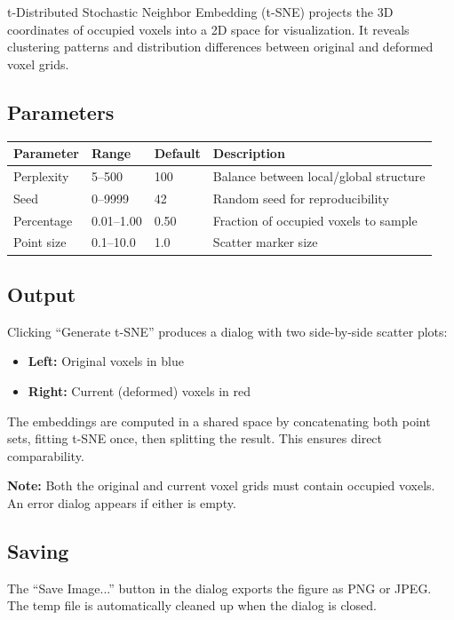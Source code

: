 \documentclass[12pt,a4paper]{article}
\begin{document}
t-Distributed Stochastic Neighbor Embedding (t-SNE) projects the 3D coordinates of occupied voxels into a 2D space for visualization. It reveals clustering patterns and distribution differences between original and deformed voxel grids.

\subsection{Parameters}

\begin{table}[H]
\centering
\begin{tabular}{lllp{6cm}}
\toprule
\textbf{Parameter} & \textbf{Range} & \textbf{Default} & \textbf{Description} \\
\midrule
Perplexity & 5--500 & 100 & Balance between local/global structure \\
Seed & 0--9999 & 42 & Random seed for reproducibility \\
Percentage & 0.01--1.00 & 0.50 & Fraction of occupied voxels to sample \\
Point size & 0.1--10.0 & 1.0 & Scatter marker size \\
\bottomrule
\end{tabular}
\end{table}

\subsection{Output}

Clicking ``Generate t-SNE'' produces a dialog with two side-by-side scatter plots:
\begin{itemize}
  \item \textbf{Left:} Original voxels in blue
  \item \textbf{Right:} Current (deformed) voxels in red
\end{itemize}

The embeddings are computed in a shared space by concatenating both point sets, fitting t-SNE once, then splitting the result. This ensures direct comparability.

\textbf{Note:} Both the original and current voxel grids must contain occupied voxels. An error dialog appears if either is empty.

\subsection{Saving}

The ``Save Image...'' button in the dialog exports the figure as PNG or JPEG. The temp file is automatically cleaned up when the dialog is closed.
\end{document}
